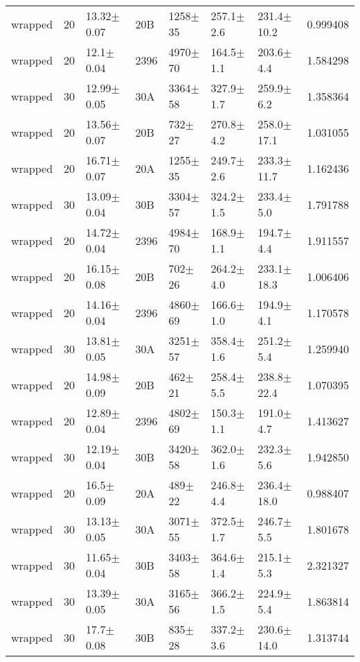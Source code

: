\begin{tabular}{lrlllllr}
      wrapped &      20 &   13.32$\pm$0.07 &     20B &  1258$\pm$35 &   257.1$\pm$2.6 &  231.4$\pm$10.2 &    0.999408 \\
      wrapped &      20 &    12.1$\pm$0.04 &    2396 &  4970$\pm$70 &   164.5$\pm$1.1 &   203.6$\pm$4.4 &    1.584298 \\
      wrapped &      30 &   12.99$\pm$0.05 &     30A &  3364$\pm$58 &   327.9$\pm$1.7 &   259.9$\pm$6.2 &    1.358364 \\
      wrapped &      20 &   13.56$\pm$0.07 &     20B &   732$\pm$27 &   270.8$\pm$4.2 &  258.0$\pm$17.1 &    1.031055 \\
      wrapped &      20 &   16.71$\pm$0.07 &     20A &  1255$\pm$35 &   249.7$\pm$2.6 &  233.3$\pm$11.7 &    1.162436 \\
      wrapped &      30 &   13.09$\pm$0.04 &     30B &  3304$\pm$57 &   324.2$\pm$1.5 &   233.4$\pm$5.0 &    1.791788 \\
      wrapped &      20 &   14.72$\pm$0.04 &    2396 &  4984$\pm$70 &   168.9$\pm$1.1 &   194.7$\pm$4.4 &    1.911557 \\
      wrapped &      20 &   16.15$\pm$0.08 &     20B &   702$\pm$26 &   264.2$\pm$4.0 &  233.1$\pm$18.3 &    1.006406 \\
      wrapped &      20 &   14.16$\pm$0.04 &    2396 &  4860$\pm$69 &   166.6$\pm$1.0 &   194.9$\pm$4.1 &    1.170578 \\
      wrapped &      30 &   13.81$\pm$0.05 &     30A &  3251$\pm$57 &   358.4$\pm$1.6 &   251.2$\pm$5.4 &    1.259940 \\
      wrapped &      20 &   14.98$\pm$0.09 &     20B &   462$\pm$21 &   258.4$\pm$5.5 &  238.8$\pm$22.4 &    1.070395 \\
      wrapped &      20 &   12.89$\pm$0.04 &    2396 &  4802$\pm$69 &   150.3$\pm$1.1 &   191.0$\pm$4.7 &    1.413627 \\
      wrapped &      30 &   12.19$\pm$0.04 &     30B &  3420$\pm$58 &   362.0$\pm$1.6 &   232.3$\pm$5.6 &    1.942850 \\
      wrapped &      20 &    16.5$\pm$0.09 &     20A &   489$\pm$22 &   246.8$\pm$4.4 &  236.4$\pm$18.0 &    0.988407 \\
      wrapped &      30 &   13.13$\pm$0.05 &     30A &  3071$\pm$55 &   372.5$\pm$1.7 &   246.7$\pm$5.5 &    1.801678 \\
      wrapped &      30 &   11.65$\pm$0.04 &     30B &  3403$\pm$58 &   364.6$\pm$1.4 &   215.1$\pm$5.3 &    2.321327 \\
      wrapped &      30 &   13.39$\pm$0.05 &     30A &  3165$\pm$56 &   366.2$\pm$1.5 &   224.9$\pm$5.4 &    1.863814 \\
      wrapped &      30 &    17.7$\pm$0.08 &     30B &   835$\pm$28 &   337.2$\pm$3.6 &  230.6$\pm$14.0 &    1.313744 \\
\hline
\end{tabular}


